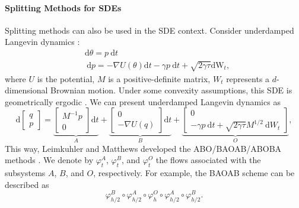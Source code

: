 \documentclass[11pt, twoside]{report}
\begin{document}
\paragraph{Splitting Methods for SDEs}
Splitting methods can also be used in the SDE context. Consider underdamped Langevin dynamics \cite{leimkuhler2015molecular}:
$$
\begin{aligned}
& \mathrm{d} \theta=p \mathrm{~d} t \\
& \mathrm{~d} p=-\nabla U(\theta) \mathrm{d} t-\gamma p \mathrm{~d} t+\sqrt{2 \gamma \tau} \mathrm{dW}_t,
\end{aligned}
$$
where $U$ is the potential, $M$ is a positive-definite matrix, $W_t$ represents a $d$-dimensional Brownian motion.
Under some convexity assumptions, this SDE is geometrically ergodic \cite{leimkuhler2024abo}.
We can present underdamped Langevin dynamics  as
\begin{equation}
\mathrm{d}\left[\begin{array}{l}
q \\
p
\end{array}\right]=\underbrace{\left[\begin{array}{c}
M^{-1} p \\
0
\end{array}\right] \mathrm{d} t}_A+\underbrace{\left[\begin{array}{c}
0 \\
-\nabla U(q)
\end{array}\right] \mathrm{d} t}_B+\underbrace{\left[\begin{array}{c}
0 \\
-\gamma p \mathrm{~d} t+\sqrt{2 \gamma \tau} M^{1 / 2} \mathrm{~d} W_t
\end{array}\right]}_O,
\end{equation}
This way, Leimkuhler and Matthews developed the ABO/BAOAB/ABOBA methods \cite{leimkuhler2024abo,leimkuhler2013rational}. We denote by $\varphi_t^A$, $\varphi_t^B$, and $\varphi_t^O$ the flows
associated with the subsystems $A$, $B$, and $O$, respectively. For example, the BAOAB scheme can be described as
\begin{equation} \label{eq:baoab_flow}
\varphi_{h/2}^{B} \circ \varphi_{h/2}^{A} \circ \varphi_{h}^{O}
\circ \varphi_{h/2}^{A} \circ \varphi_{h/2}^{B}.
\end{equation}
\end{document}
